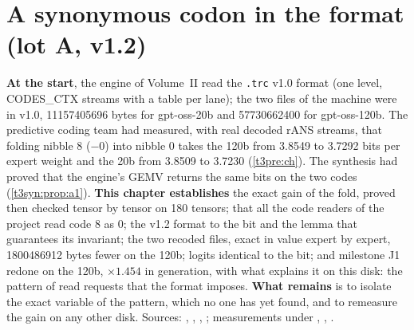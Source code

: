 
\chapter{A synonymous codon in the format (lot A, v1.2)}\label{t3cod:ch}

\begin{origine}
\textbf{At the start}, the engine of Volume~II read the \texttt{.trc} v1.0 format (one level, CODES\_CTX streams with a table per lane); the two files of the machine were in v1.0, \num{11157405696} bytes for gpt-oss-20b and \num{57730662400} for gpt-oss-120b. The predictive coding team had measured, with real decoded rANS streams, that folding nibble 8 ($-0$) into nibble 0 takes the 120b from 3.8549 to 3.7292 bits per expert weight and the 20b from 3.8509 to 3.7230 (\cref{t3pre:ch}). The synthesis had proved that the engine's GEMV returns the same bits on the two codes (\cref{t3syn:prop:a1}).
\textbf{This chapter establishes} the exact gain of the fold, proved then checked tensor by tensor on 180 tensors; that all the code readers of the project read code 8 as 0; the v1.2 format to the bit and the lemma that guarantees its invariant; the two recoded files, exact in value expert by expert, \num{1800486912} bytes fewer on the 120b; logits identical to the bit; and milestone J1 redone on the 120b, $\times 1.454$ in generation, with what explains it on this disk: the pattern of read requests that the format imposes.
\textbf{What remains} is to isolate the exact variable of the pattern, which no one has yet found, and to remeasure the gain on any other disk.
Sources: , , , ; measurements under , , .
\end{origine}


